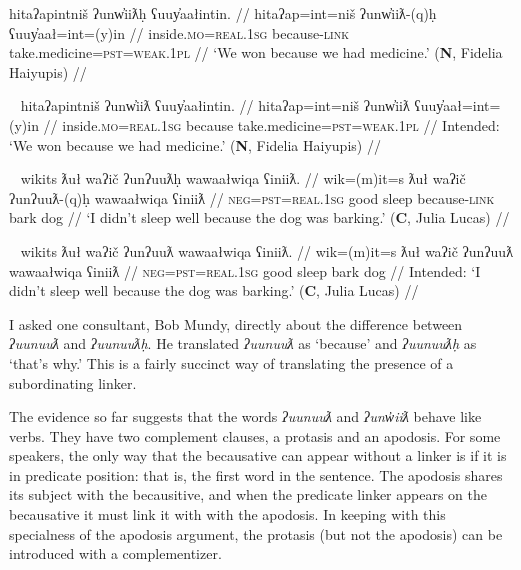 \begin{comment}
\ex~ \label{ex:because2}
\begingl
\glpreamble ʔuunuuƛḥs hiniiʔiƛ ʔin m̓iƛaa. //
\gla ʔuunuuƛ-(q)ḥ=s mačiił ʔin m̓iƛ-aˑ //
\glb because-\textsc{link}=\textsc{strg.1sg} inside.\textsc{mo} \textsc{comp} rain-\textsc{dr} //
\glft `I came inside because it was raining.' (\textbf{N}, Fidelia Haiyupis) //
\endgl
\xe
\end{comment}

\ex \label{ex:unwiitllink2}
\begingl
\glpreamble hitaʔapintniš ʔunw̓iiƛḥ ʕuuy̓aałintin. //
\gla hitaʔap=int=niš ʔunw̓iiƛ-(q)ḥ ʕuuy̓aał=int=(y)in //
\glb inside.\textsc{mo}=\textsc{real.1sg} because-\textsc{link} take.medicine=\textsc{pst}=\textsc{weak.1pl} //
\glft `We won because we had medicine.' (\textbf{N}, Fidelia Haiyupis) //
\endgl
\xe

\ex~ \label{ex:unwiitllink3}
\begingl
\glpreamble *hitaʔapintniš ʔunw̓iiƛ ʕuuy̓aałintin. //
\gla hitaʔap=int=niš ʔunw̓iiƛ ʕuuy̓aał=int=(y)in //
\glb inside.\textsc{mo}=\textsc{real.1sg} because take.medicine=\textsc{pst}=\textsc{weak.1pl} //
\glft Intended: `We won because we had medicine.' (\textbf{N}, Fidelia Haiyupis) //
\endgl
\xe

\ex~ \label{ex:uunuutllink1}
\begingl
\glpreamble wikits ƛuł waʔič ʔunʔuuƛḥ wawaałwiqa ʕiniiƛ. //
\gla wik=(m)it=s ƛuł waʔič ʔunʔuuƛ-(q)ḥ wawaałwiqa ʕiniiƛ //
\glb \textsc{neg}=\textsc{pst}=\textsc{real.1sg} good sleep because-\textsc{link} bark dog //
\glft `I didn't sleep well because the dog was barking.' (\textbf{C}, Julia Lucas) //
\endgl
\xe

\ex~ \label{ex:uunuutllink2}
\begingl
\glpreamble *wikits ƛuł waʔič ʔunʔuuƛ wawaałwiqa ʕiniiƛ. //
\gla wik=(m)it=s ƛuł waʔič ʔunʔuuƛ wawaałwiqa ʕiniiƛ //
\glb \textsc{neg}=\textsc{pst}=\textsc{real.1sg} good sleep bark dog //
\glft Intended: `I didn't sleep well because the dog was barking.' (\textbf{C}, Julia Lucas) //
\endgl
\xe

I asked one consultant, Bob Mundy, directly about the difference between \textit{ʔuunuuƛ} and \textit{ʔuunuuƛḥ}. He translated \textit{ʔuunuuƛ} as `because' and \textit{ʔuunuuƛḥ} as `that's why.' This is a fairly succinct way of translating the presence of a subordinating linker.

The evidence so far suggests that the words \textit{ʔuunuuƛ} and \textit{ʔunw̓iiƛ} behave like verbs. They have two complement clauses, a protasis and an apodosis. For some speakers, the only way that the becausative can appear without a linker is if it is in predicate position: that is, the first word in the sentence. The apodosis shares its subject with the becausitive, and when the predicate linker appears on the becausative it must link it with with the apodosis. In keeping with this specialness of the apodosis argument, the protasis (but not the apodosis) can be introduced with a complementizer.


